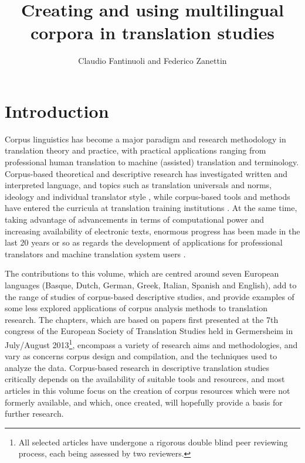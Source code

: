 \documentclass[output=paper]{LSP/langsci}
\author{Claudio Fantinuoli and Federico Zanettin}
\title{Creating and using multilingual corpora in translation studies}
\begin{document}
\section{Introduction}
Corpus linguistics has become a major paradigm and research methodology in translation theory and practice, with practical applications ranging from professional human translation to machine (assisted) translation and terminology. Corpus-based theoretical and descriptive research has investigated written and interpreted language, and topics such as translation universals and norms, ideology and individual translator style \citep{Laviosa2002, Olohan2004, Zanettin2012}, while corpus-based tools and methods have entered the curricula at translation training institutions \citep{Zanettin2003, Beeby2009}. At the same time, taking advantage of advancements in terms of computational power and increasing availability of electronic texts, enormous progress has been made in the last 20 years or so as regards the development of applications for professional translators and machine translation system users \citep{Coehn2009, Brunette2013}.

The contributions to this volume, which are centred around seven European languages (Basque, Dutch, German, Greek, Italian, Spanish and English), add to the range of studies of corpus-based descriptive studies, and provide examples of some less explored applications of corpus analysis methods to translation research. The chapters, which are based on papers first presented at the 7th congress of the European Society of Translation Studies held in Germersheim in July/August 2013\footnote{All selected articles have undergone a rigorous double blind peer reviewing process, each being assessed by two reviewers.},  encompass a variety of research aims and methodologies, and vary as concerns corpus design and compilation, and the techniques used to analyze the data. Corpus-based research in descriptive translation studies critically depends on the availability of suitable tools and resources, and most articles in this volume focus on the creation of corpus resources which were not formerly available, and which, once created, will hopefully provide a basis for further research. 
\end{document}
